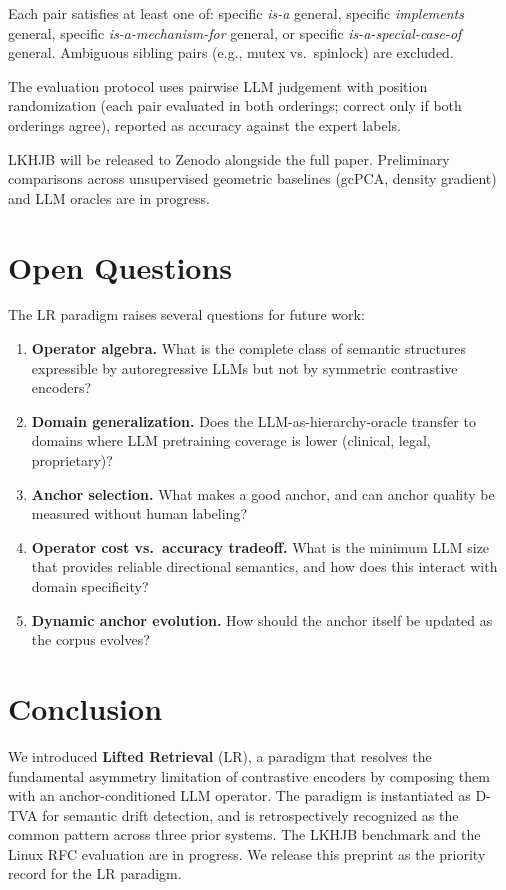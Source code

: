 \documentclass[twocolumn]{article}
\newcommand{\dtva}{\textsc{D-TVA}}
\newcommand{\lr}{\textsc{LR}}
\begin{document}
Each pair satisfies at least one of: specific \emph{is-a} general,
specific \emph{implements} general, specific \emph{is-a-mechanism-for}
general, or specific \emph{is-a-special-case-of} general.
Ambiguous sibling pairs (e.g., mutex vs.\ spinlock) are excluded.

The evaluation protocol uses pairwise LLM judgement with position
randomization (each pair evaluated in both orderings; correct only if
both orderings agree), reported as accuracy against the expert labels.

LKHJB will be released to Zenodo alongside the full paper.
Preliminary comparisons across unsupervised geometric baselines (gcPCA,
density gradient) and LLM oracles are in progress.

\section{Open Questions}
\label{sec:open}

The \lr{} paradigm raises several questions for future work:
\begin{enumerate}[leftmargin=*,itemsep=1pt]
\item \textbf{Operator algebra.} What is the complete class of
  semantic structures expressible by autoregressive LLMs but not by
  symmetric contrastive encoders?
\item \textbf{Domain generalization.} Does the LLM-as-hierarchy-oracle
  transfer to domains where LLM pretraining coverage is lower (clinical,
  legal, proprietary)?
\item \textbf{Anchor selection.} What makes a good anchor, and can
  anchor quality be measured without human labeling?
\item \textbf{Operator cost vs.\ accuracy tradeoff.} What is the
  minimum LLM size that provides reliable directional semantics,
  and how does this interact with domain specificity?
\item \textbf{Dynamic anchor evolution.} How should the anchor itself
  be updated as the corpus evolves?
\end{enumerate}

\section{Conclusion}
\label{sec:conclusion}

We introduced \textbf{Lifted Retrieval} (\lr{}), a paradigm that
resolves the fundamental asymmetry limitation of contrastive encoders
by composing them with an anchor-conditioned LLM operator.
The paradigm is instantiated as \dtva{} for semantic drift detection,
and is retrospectively recognized as the common pattern across three
prior systems.
The LKHJB benchmark and the Linux RFC evaluation are in progress.
We release this preprint as the priority record for the \lr{} paradigm.



\end{document}
